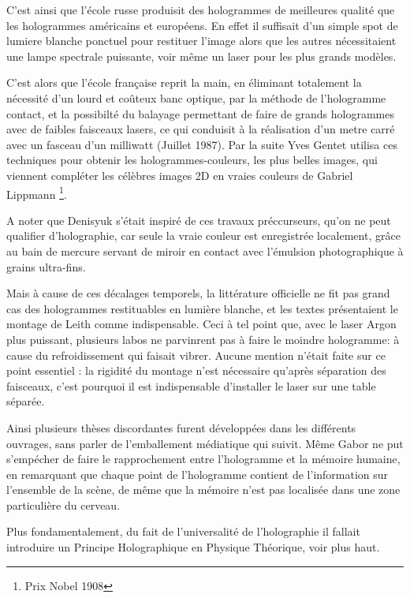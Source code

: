 \documentclass[a4paper,12pt]{article}
\begin{document}
C'est ainsi que l'école russe produisit des hologrammes de meilleures qualité que les hologrammes américains et européens. En effet il suffisait d'un simple spot de lumiere blanche ponctuel pour restituer l'image alors que les autres nécessitaient une lampe spectrale puissante, voir m\^eme un laser pour les plus grands modèles.



C'est alors que l'école française reprit la main, en éliminant totalement la nécessité d'un lourd et co\^uteux banc optique, par la méthode de l'hologramme contact, et la possibilté du balayage permettant de faire de grands hologrammes avec de faibles faisceaux lasers, ce qui conduisit à la réalisation d'un metre carré avec un fasceau d'un milliwatt (Juillet 1987). Par la suite Yves Gentet utilisa ces techniques pour obtenir les hologrammes-couleurs, les plus belles images, qui viennent compléter les célèbres images 2D en vraies couleurs de Gabriel Lippmann \footnote{Prix Nobel 1908}. 



A noter que Denisyuk s'était inspiré de ces travaux préccurseurs, qu'on ne peut qualifier d'holographie, car seule la vraie couleur est enregistrée localement, gr\^ace au bain de mercure servant de miroir en contact avec l'émulsion photographique à grains ultra-fins.


Mais à cause de ces décalages temporels, la littérature officielle ne fit pas grand cas des hologrammes restituables en lumière blanche, et les textes présentaient le montage de Leith comme indispensable. Ceci à tel point que, avec le laser Argon plus puissant, plusieurs labos ne parvinrent pas à faire le moindre hologramme: à cause du refroidissement qui faisait vibrer. Aucune mention n'était faite sur ce point essentiel : la rigidité du montage n'est nécessaire qu'après séparation des faisceaux, c'est pourquoi il est indispensable d'installer le laser sur une table séparée.


Ainsi plusieurs thèses discordantes furent développées dans les différents ouvrages, sans parler de l'emballement médiatique qui suivit. Même Gabor ne put s'empécher de faire le rapprochement entre l'hologramme et la mémoire humaine, en remarquant que chaque point de l'hologramme contient de l'information sur l'ensemble de la scène, de même que la mémoire n'est pas localisée dans une zone particulière du cerveau.


Plus fondamentalement, du fait de l'universalité de l'holographie il fallait introduire un Principe Holographique en Physique Théorique, voir plus haut.
\end{document}
